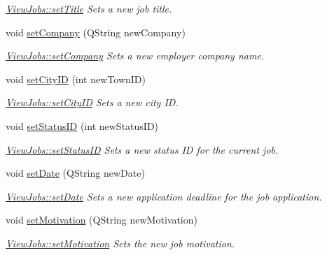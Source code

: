 \begin{DoxyCompactItemize}
\begin{DoxyCompactList}\small\item\em \mbox{\hyperlink{class_view_jobs_abfe1969197cde57ea049c1b7d91cd4f5}{View\+Jobs\+::set\+Title}} Sets a new job title. \end{DoxyCompactList}\item 
void \mbox{\hyperlink{class_view_jobs_a596246d07be66a5aeaf14ff8e5649290}{set\+Company}} (Q\+String new\+Company)
\begin{DoxyCompactList}\small\item\em \mbox{\hyperlink{class_view_jobs_a596246d07be66a5aeaf14ff8e5649290}{View\+Jobs\+::set\+Company}} Sets a new employer company name. \end{DoxyCompactList}\item 
void \mbox{\hyperlink{class_view_jobs_ad89218b37af85cac9ce6c346efb57e56}{set\+City\+ID}} (int new\+Town\+ID)
\begin{DoxyCompactList}\small\item\em \mbox{\hyperlink{class_view_jobs_ad89218b37af85cac9ce6c346efb57e56}{View\+Jobs\+::set\+City\+ID}} Sets a new city ID. \end{DoxyCompactList}\item 
void \mbox{\hyperlink{class_view_jobs_a55943415fd91377d5f701f7074ba58d6}{set\+Status\+ID}} (int new\+Status\+ID)
\begin{DoxyCompactList}\small\item\em \mbox{\hyperlink{class_view_jobs_a55943415fd91377d5f701f7074ba58d6}{View\+Jobs\+::set\+Status\+ID}} Sets a new status ID for the current job. \end{DoxyCompactList}\item 
void \mbox{\hyperlink{class_view_jobs_a7574794410eb40956f343976de97221f}{set\+Date}} (Q\+String new\+Date)
\begin{DoxyCompactList}\small\item\em \mbox{\hyperlink{class_view_jobs_a7574794410eb40956f343976de97221f}{View\+Jobs\+::set\+Date}} Sets a new application deadline for the job application. \end{DoxyCompactList}\item 
void \mbox{\hyperlink{class_view_jobs_a53bdfabaf2b442841d676f42ebbf975f}{set\+Motivation}} (Q\+String new\+Motivation)
\begin{DoxyCompactList}\small\item\em \mbox{\hyperlink{class_view_jobs_a53bdfabaf2b442841d676f42ebbf975f}{View\+Jobs\+::set\+Motivation}} Sets the new job motivation. \end{DoxyCompactList}\item 

\end{DoxyCompactItemize}
